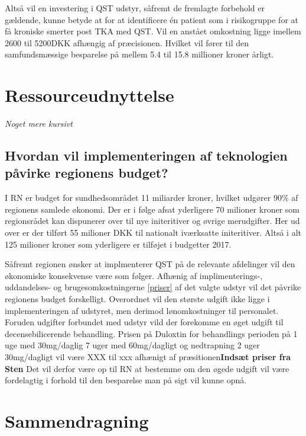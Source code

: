 Altså vil en investering i QST udstyr, såfremt de fremlagte forbehold er gældende, kunne betyde at for at identificere én patient som i risikogruppe for at få kroniske smerter post TKA med QST. Vil en anstået omkostning ligge imellem 2600 til 5200DKK afhængig af præcisionen. Hvilket vil fører til den samfundsmæssige besparelse på mellem 5.4 til 15.8 millioner kroner årligt.
\section{Ressourceudnyttelse}
\textit{Noget mere kursivt}
\subsection{Hvordan vil implementeringen af teknologien påvirke regionens budget?}
I RN er budget for sundhedsområdet 11 miliarder kroner, hvilket udgører 90\% af regionens samlede økonomi. \citep{RnBudget17}  Der er i følge  afsat yderligere 70 milioner kroner som regionsrådet kan dispunerer over til nye initeritiver og øvrige merudgifter. Her ud over er der tilført 55 milioner DKK til nationalt iværksatte initeritiver. Altså i alt 125 milioner kroner som yderligere er tilføjet i budgetter 2017.

Såfremt regionen ønsker at implmenterer QST på de relevante afdelinger vil den økonomiske konsekvense være som følger. Afhænig af implimenterings-, uddandelses- og brugesomkostningerne \ref{priser} af det valgte udstyr vil det påvrike regionens budget forskelligt. Overordnet vil den største udgift ikke ligge i implementeringen af udstyret, men derimod lønomkostninger til personalet. Foruden udgifter forbundet med udstyr vild der forekomme en øget udgift til decensebilicerende behandling. Prisen på  Duloxtin for behandlings perioden på 1 uge med 30mg/daglig 7 uger med 60mg/dagligt og nedtrapning 2 uger 30mg/dagligt vil være XXX til xxx afhænigt af præsitionen\textbf{Indsæt priser fra Sten} Det vil derfor være op til RN at bestemme om den øgede udgift vil være fordelagtig i forhold til den besparelse man på sigt vil kunne opnå.


\section{Sammendragning}

